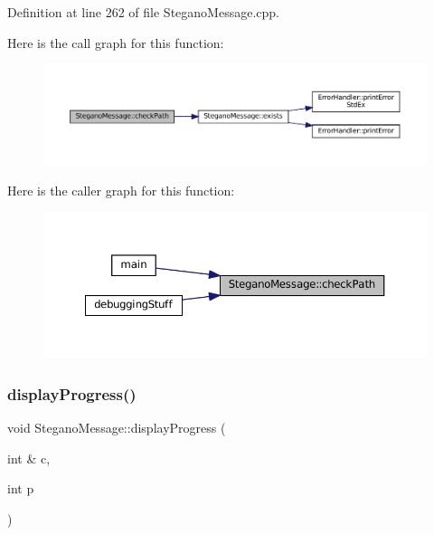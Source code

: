 Definition at line 262 of file Stegano\+Message.\+cpp.

Here is the call graph for this function\+:\nopagebreak
\begin{figure}[H]
\begin{center}
\leavevmode
\includegraphics[width=350pt]{classSteganoMessage_a9d87adef1584cc184ccd4b5d86fba744_cgraph}
\end{center}
\end{figure}
Here is the caller graph for this function\+:\nopagebreak
\begin{figure}[H]
\begin{center}
\leavevmode
\includegraphics[width=350pt]{classSteganoMessage_a9d87adef1584cc184ccd4b5d86fba744_icgraph}
\end{center}
\end{figure}
\mbox{\label{classSteganoMessage_a50936bb2352eaaa1112280c2ac3ca2d5}} 
\subsubsection{\texorpdfstring{displayProgress()}{displayProgress()}\hspace{0.1cm}{\footnotesize\ttfamily [1/2]}}
{\footnotesize\ttfamily void Stegano\+Message\+::display\+Progress (\begin{DoxyParamCaption}\item[{int \&}]{c,  }\item[{int}]{p }\end{DoxyParamCaption})\hspace{0.3cm}{\ttfamily [private]}}



